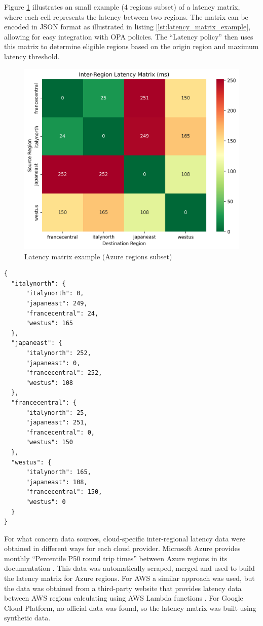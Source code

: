 Figure \ref{fig:latency_matrix} illustrates an small example (4 regions subset) of a latency matrix, where each cell represents the latency between two regions. The matrix can be encoded in JSON format as illustrated in listing \ref{lst:latency_matrix_example}, allowing for easy integration with OPA policies. The ``Latency policy'' then uses this matrix to determine eligible regions based on the origin region and maximum latency threshold.

\begin{figure}[H]
  \centering
  \includegraphics[width=0.575\linewidth]{images/latency_heatmap.png}
  \caption{Latency matrix example (Azure regions subset)}
  \label{fig:latency_matrix}
\end{figure}

\lstset{style=jsonstyle}
\begin{lstlisting}[caption={Latancy matrix example encoded in JSON format}, label={lst:latency_matrix_example}]
{
  "italynorth": {
      "italynorth": 0,
      "japaneast": 249,
      "francecentral": 24,
      "westus": 165
  },
  "japaneast": {
      "italynorth": 252,
      "japaneast": 0,
      "francecentral": 252,
      "westus": 108
  },
  "francecentral": {
      "italynorth": 25,
      "japaneast": 251,
      "francecentral": 0,
      "westus": 150
  },
  "westus": {
      "italynorth": 165,
      "japaneast": 108,
      "francecentral": 150,
      "westus": 0
  }
}

\end{lstlisting}

For what concern data sources, cloud-specific inter-regional latency data were obtained in different ways for each cloud provider.
Microsoft Azure provides monthly ``Percentile P50 round trip times'' between Azure regions in its documentation \cite{azure_network_latency}. 
This data was automatically scraped, merged and used to build the latency matrix for Azure regions.
For AWS a similar approach was used, but the data was obtained from a third-party website that provides latency data between AWS regions calculating using AWS Lambda functions \cite{cloudping}.
For Google Cloud Platform, no official data was found, so the latency matrix was built using synthetic data.

